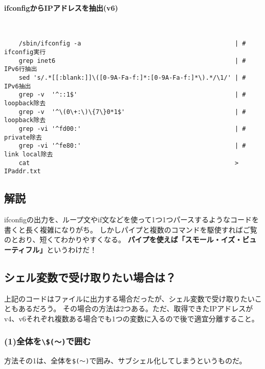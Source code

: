 \paragraph{ifconfigからIPアドレスを抽出(v6)} 　\\
\begin{frameboxit}{160.0mm}
\begin{verbatim}
	/sbin/ifconfig -a                                          | # ifconfig実行
	grep inet6                                                 | # IPv6行抽出
	sed 's/.*[[:blank:]]\([0-9A-Fa-f:]*:[0-9A-Fa-f:]*\).*/\1/' | # IPv6抽出
	grep -v  '^::1$'                                           | # loopback除去
	grep -v  '^\(0\+:\)\{7\}0*1$'                              | # loopback除去
	grep -vi '^fd00:'                                          | # private除去
	grep -vi '^fe80:'                                          | # link local除去
	cat                                                        > IPaddr.txt
\end{verbatim}
\end{frameboxit}

\subsection*{解説}

ifconfigの出力を、ループ文やif文などを使って1つ1つパースするようなコードを書くと長く複雑になりがち。
しかしパイプと複数のコマンドを駆使すればご覧のとおり、短くてわかりやすくなる。
\textbf{パイプを使えば「スモール・イズ・ビューティフル」}というわけだ！

\subsection*{シェル変数で受け取りたい場合は？}

上記のコードはファイルに出力する場合だったが、シェル変数で受け取りたいこともあるだろう。
その場合の方法は2つある。ただ、取得できたIPアドレスがv4、v6それぞれ複数ある場合でも1つの変数に入るので後で適宜分離すること。

\subsubsection*{(1)全体を\verb|\$(～)|で囲む}

方法その1は、全体を\verb|$(～)|で囲み、サブシェル化してしまうというものだ。

